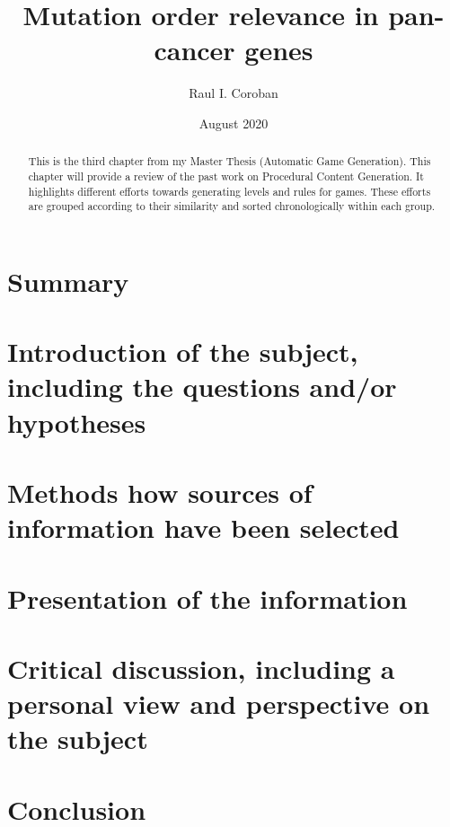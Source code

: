 \documentclass[a4paper]{article}
\title{Mutation order relevance in pan-cancer genes}
\author{Raul I. Coroban}
\date{August 2020}
\begin{document}
\maketitle

\begin{abstract}
This is the third chapter from my Master Thesis (Automatic Game Generation). This chapter will provide a review of the past work on Procedural Content Generation. It highlights different efforts towards generating levels and rules for games. These efforts are grouped according to their similarity and sorted chronologically within each group.
\end{abstract}

\section{Summary}


\section{Introduction of the subject, including the questions and/or hypotheses}


\section{Methods how sources of information have been selected}


\section{Presentation of the information}


\section{Critical discussion, including a personal view and perspective on the subject}


\section{Conclusion}




\end{document}
